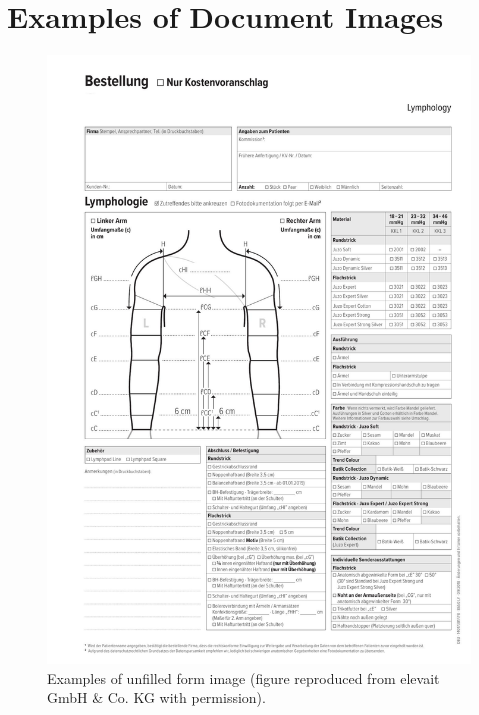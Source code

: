 \section{Examples of Document Images}
\vspace*{0.5cm}
\begin{figure}[H]
        \begin{center}
	    \includegraphics[scale=0.29]{images/Appendix/UnfilledForm.png}
	    \caption[Example of unfilled form image.]{Examples of unfilled form image (figure reproduced from elevait GmbH \& Co. KG with permission).}
	    \label{fig:EmptyForm}
	    \end{center}
\end{figure}

